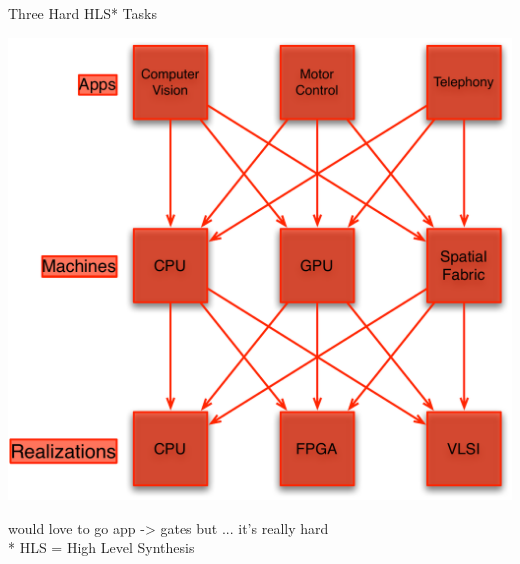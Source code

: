 \documentclass[xcolor=pdflatex,dvipsnames,table]{beamer}
\begin{document}
\begin{frame}[fragile]{Three Hard HLS* Tasks}
\begin{center}
\includegraphics[height=0.7\textheight]{figs/apps-realizations.pdf} \\[0.5cm]
\end{center}
would love to go app -> gates but ... it's really hard \\[0.5cm]
* HLS = High Level Synthesis

\end{frame}
\end{document}
